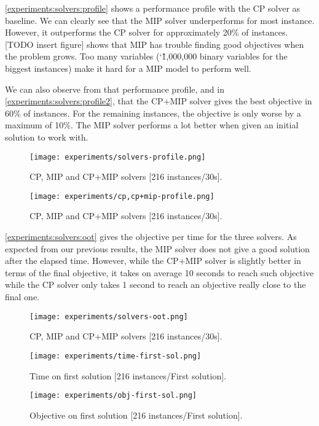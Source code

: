\documentclass[../../thesis.tex]{subfiles}
\begin{document}
\autoref{experiments:solvers:profile} 
shows a performance profile with the CP solver as baseline. We can clearly see that 
the MIP solver underperforms for most instance. However, it outperforms the CP solver for approximately
20\% of instances. [TODO insert figure] shows that MIP has trouble finding good objectives when the 
problem grows. Too many variables (\char`\~ 1,000,000 binary variables for the biggest instances) make it hard for a MIP model to perform well.

We can also observe from that performance profile, and in \autoref{experiments:solvers:profile2}, that 
the CP+MIP solver gives the best objective in 60\% of instances. For the remaining instances, the objective is only worse by a maximum of 10\%. 
The MIP solver performs a lot better when given an initial solution to work with.

\begin{figure}
  \centering
  \texttt{[image: experiments/solvers-profile.png]}
  \caption{CP, MIP and CP+MIP solvers [216 instances/30s].}
  \label{experiments:solvers:profile}
\end{figure}

\begin{figure}
  \centering
  \texttt{[image: experiments/cp,cp+mip-profile.png]}
  \caption{CP, MIP and CP+MIP solvers [216 instances/30s].}
  \label{experiments:solvers:profile2}
\end{figure}



\autoref{experiments:solvers:oot} gives the objective per time for the three solvers. As expected from our previous results, the MIP solver does not 
give a good solution after the elapsed time. However, while the CP+MIP solver is slightly better in terms of the final objective, it takes on average 10 seconds 
to reach such objective while the CP solver only takes 1 second to reach an objective really close to the final one.



\begin{figure}
  \centering
  \texttt{[image: experiments/solvers-oot.png]}
  \caption{CP, MIP and CP+MIP solvers [216 instances/30s].}
  \label{experiments:solvers:oot}
\end{figure}


\begin{figure}
  \centering
  \texttt{[image: experiments/time-first-sol.png]}
  \caption{Time on first solution [216 instances/First solution].}
  \label{experiments:first-sol-time}
\end{figure}


\begin{figure}
  \centering
  \texttt{[image: experiments/obj-first-sol.png]}
  \caption{Objective on first solution [216 instances/First solution].}
  \label{experiments:first-sol-obj}
\end{figure}
\end{document}

